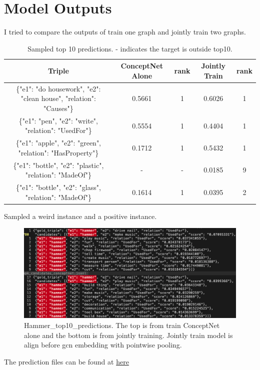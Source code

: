 \clearpage
\section{Model Outputs}

I tried to compare the outputs of train one graph and jointly train two graphs. 



\begin{table}[!h]
\begin{adjustbox}{max width=\textwidth}
\begin{tabular}{c|c|c|c|c}
    \hline
    Triple & ConceptNet Alone &rank & Jointly Train & rank \\\hline
    \{"e1": "do housework", "e2": "clean house", "relation": "Causes"\} & 	0.5661 & 	1 & 	0.6026	& 1 \\
     \{"e1": "pen", "e2": "write", "relation": "UsedFor"\} &	0.5554 &	1 &	0.4404	&1 \\
    \{"e1": "apple", "e2": "green", "relation": "HasProperty"\} & 0.1712 & 1 & 0.5432 & 1\\
     \{"e1": "bottle", "e2": "plastic", "relation": "MadeOf"\}	&	- & - &	0.0185	&9 \\
     \{"e1": "bottle", "e2": "glass", "relation": "MadeOf"\} &	0.1614 &	1&	0.0395&	2 \\\hline
\end{tabular}
\end{adjustbox}
\caption{Sampled top 10 predictions. - indicates the target is outside top10. }
\end{table}

Sampled a weird instance and a positive instance. 

\begin{figure}[!ht]
    \centering
    \includegraphics[scale=0.45]{images/hammer_top10_predictions.png}
    \caption{Hammer\_top10\_predictions. The top is from train ConceptNet alone and the bottom is from jointly training. Jointly train model is align before gcn embedding with pointwise pooling.}
    \label{fig:hammer-top10-prediction}
\end{figure}


The prediction files can be found at  \href{https://unimelbcloud-my.sharepoint.com/:f:/g/personal/chunhua_student_unimelb_edu_au/EuJ4GNdJNnFAmiDw7eE13oIBzBR7eJUrvyPRSEi8mrXIFw?e=bl9BcD}{here}
%

